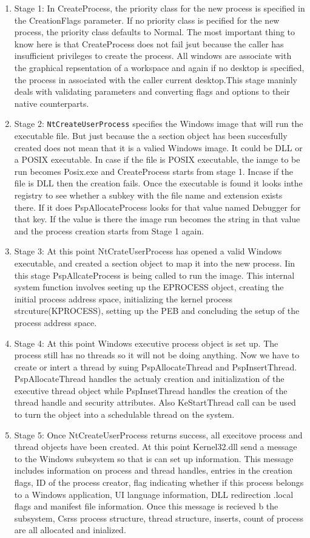 \documentclass[letterpaper,10pt,draftclsnofoot,onecolumn]{IEEEtran}
\begin{document}
\begin{enumerate}
\item Stage 1: In CreateProcess, the priority class for the new process is specified in the CreationFlags parameter. If no priority class is pecified for the new process, the priority class defaults to Normal. The most important thing to know here is that CreateProcess does not fail jsut because the caller has insufficient privileges to create the process. All windows are associate with the graphical repsentation of a workspace and again if no desktop is specified, the process in associated with the caller current desktop.This stage maninly deals with validating parameters and converting flags and options to their native counterparts.
\item Stage 2: \verb|NtCreateUserProcess| specifies the Windows image that will run the executable file. But just because the a section object has been succesfully created does not mean that it is a valied Windows image. It could be DLL or a POSIX executable. In case if the file is POSIX executable, the iamge to be run becomes Posix.exe and CreateProcess starts from stage 1. Incase if the file is DLL then the creation fails. Once the executable is found it looks inthe registry to see whether a subkey with the file name and extension exists there. If it does PspAllocateProcess looks for that value named Debugger for that key. If the value is there the image run becomes the string in that value and the process creation starts from Stage 1 again.
\item Stage 3: At this point NtCrateUserProcess has opened a valid Windows executable, and created a section object to map it into the new process. Iin this stage PspAllcateProcess is being called to run the image. This internal system function involves seeting up the EPROCESS object, creating the initial process address space, initializing the kernel process strcuture(KPROCESS), setting up the PEB and concluding the setup of the process address space.
\item Stage 4: At this point Windows executive process object is set up. The process still has no threads so it will not be doing anything. Now we have to create or intert a thread by suing PspAllocateThread and PspInsertThread. PspAllocateThread handles the actualy creation and initialization of the executive thread object while PspInsetThread handles the creation of the thread handle and security attributes. Also KeStartThread call can be used to turn the object into a schedulable thread on the system.
\item Stage 5: Once NtCreateUserProcess returns success, all execitove process and thread objects have been created. At this point Kernel32.dll send a message to the Windows subsystem so that is can set up information. This message includes information on process and thread handles, entries in the creation flags, ID of the process creator, flag indicating whether if this process belongs to a Windows application, UI language information, DLL redirection .local flags and manifest file information. Once this message is recieved b the subsystem, Csrss process structure, thread structure, inserts, count of process are all allocated and inialized.

\end{enumerate}
\end{document}
